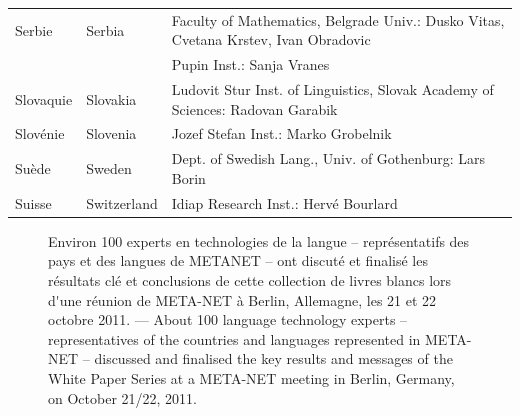 \documentclass[]{../metanetpaper}
\begin{document}
\begin{longtable}{llp{105mm}}
  Serbie & \textcolor{grey1}{Serbia} & Faculty of Mathematics, Belgrade Univ.: Dusko Vitas, Cvetana Krstev, Ivan Obradovic \\ \addlinespace
  & & Pupin Inst.: Sanja Vranes \\ \addlinespace  
  Slovaquie & \textcolor{grey1}{Slovakia} & Ludovit Stur Inst. of Linguistics, Slovak Academy of Sciences: Radovan Garabik \\ \addlinespace 
  Slovénie & \textcolor{grey1}{Slovenia} & Jozef Stefan Inst.: Marko Grobelnik \\ \addlinespace 
  Suède & \textcolor{grey1}{Sweden} & Dept. of Swedish Lang., Univ. of Gothenburg: Lars Borin \\ \addlinespace 
  Suisse & \textcolor{grey1}{Switzerland} & Idiap Research Inst.: Hervé Bourlard 
\end{longtable}
\normalsize

\renewcommand*{\figureformat}{}
\renewcommand*{\captionformat}{}

\begin{figure}[htbp]
  \center
  \caption{Environ 100 experts en technologies de la langue -- représentatifs des pays et des langues de METANET -- ont discuté et finalisé les résultats clé et conclusions de cette collection de livres blancs lors d{\mbox '}une réunion de META-NET à Berlin, Allemagne, les 21 et 22 octobre 2011. --- \textcolor{grey1}{About 100 language technology experts -- representatives of the countries and languages represented in META-NET -- discussed and finalised the key results and messages of the White Paper Series at a META-NET meeting in Berlin, Germany, on October 21/22, 2011.}}
\end{figure}

\cleardoublepage

\label{whitepaperseries}
\end{document}
